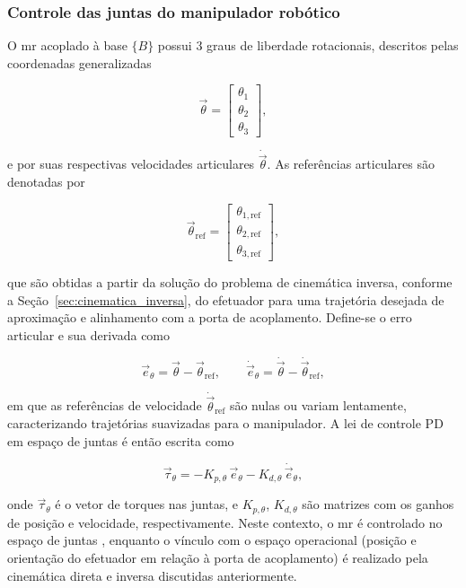 
\subsubsection{Controle das juntas do manipulador robótico}
\label{sec:controle_PD_juntas}

O \gls{mr} acoplado à base $\{B\}$ possui 3 graus de liberdade rotacionais, descritos pelas coordenadas generalizadas

\begin{equation}
\vec\theta =
\begin{bmatrix}
\theta_1 \\ \theta_2 \\ \theta_3
\end{bmatrix},
\end{equation}

e por suas respectivas velocidades articulares $\dot{\vec\theta}$.
As referências articulares são denotadas por

\begin{equation}
\vec\theta_{\text{ref}} =
\begin{bmatrix}
\theta_{1,\text{ref}} \\
\theta_{2,\text{ref}} \\
\theta_{3,\text{ref}}
\end{bmatrix},
\end{equation}

que são obtidas a partir da solução do problema de cinemática inversa, conforme a Seção~\eqref{sec:cinematica_inversa}, do efetuador para uma trajetória desejada de aproximação e alinhamento com a porta de acoplamento.
Define-se o erro articular e sua derivada como

\begin{equation}
\vec e_\theta = \vec\theta - \vec\theta_{\text{ref}},
\qquad
\dot{\vec e}_\theta = \dot{\vec\theta} - \dot{\vec\theta}_{\text{ref}},
\end{equation}

em que as referências de velocidade $\dot{\vec\theta}_{\text{ref}}$ são nulas ou variam lentamente, caracterizando trajetórias suavizadas para o manipulador.
A lei de controle PD em espaço de juntas é então escrita como

\begin{equation}
\vec\tau_\theta
=
- K_{p,\theta}\,\vec e_\theta
- K_{d,\theta}\,\dot{\vec e}_\theta,
\label{eq:controle_PD_juntas}
\end{equation}

onde $\vec\tau_\theta$
é o vetor de torques nas juntas,
e $K_{p,\theta}$, $K_{d,\theta}$
são matrizes com os ganhos de posição e velocidade, respectivamente.
Neste contexto, o \gls{mr} é controlado no espaço de juntas \cite{craig2005}, enquanto o vínculo com o espaço operacional (posição e orientação do efetuador em relação à porta de acoplamento) é realizado pela cinemática direta e inversa discutidas anteriormente.
